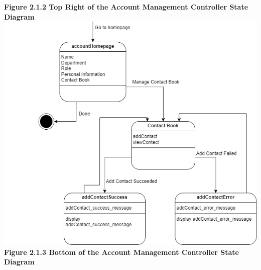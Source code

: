 \documentclass[]{article}
\begin{document}
\begin{center}
\textbf{Figure 2.1.2 Top Right of the Account Management Controller State Diagram}
\includegraphics{../images/ControllerStateDiagrams/AMCBottom.png}
\textbf{Figure 2.1.3 Bottom of the Account Management Controller State Diagram}


\end{center}
\end{document}
